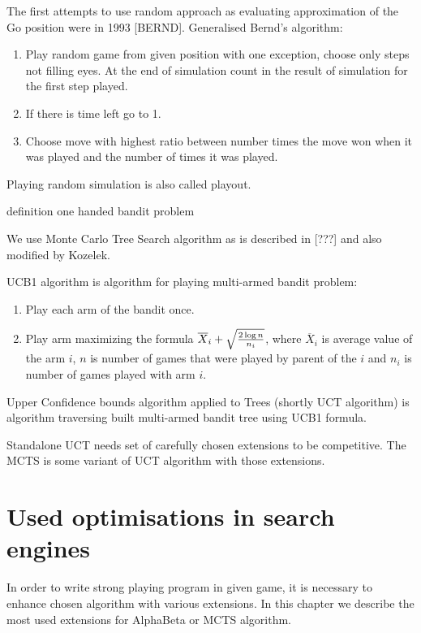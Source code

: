\documentclass[12pt,titlepage,fleqn]{report}
\begin{document}
The first attempts to use random approach as evaluating approximation of the Go
position were in 1993 [BERND]. Generalised Bernd's algorithm:

\begin{enumerate}
\item Play random game from given position with one exception, choose only
	  steps not filling eyes. At the end of simulation count in the result of
	  simulation for the first step played.
\item If there is time left go to 1.
\item Choose move with highest ratio between number times the move won when it
	  was played and the number of times it was played.
\end{enumerate}

Playing random simulation is also called playout.

definition one handed bandit problem

We use Monte Carlo Tree Search algorithm as is described in [???] and also modified by Kozelek.


UCB1 algorithm is algorithm for playing multi-armed bandit problem:

\begin{enumerate}
\item Play each arm of the bandit once.
\item Play arm maximizing the formula $\overline X_i + \sqrt{2 \log n \over n_i}$,
	  where $\overline X_i$ is average value of the arm $i$, $n$ is number
	  of games that were played by parent of the $i$ and $n_i$ is number of
	  games played with arm $i$.
\end{enumerate}

Upper Confidence bounds algorithm applied to Trees (shortly UCT algorithm) is
algorithm traversing built multi-armed bandit tree using UCB1 formula.

	

Standalone UCT needs set of carefully chosen extensions to be competitive. The
MCTS is some variant of UCT algorithm with those extensions.

\chapter{Used optimisations in search engines}

In order to write strong playing program in given game, it is necessary to
enhance chosen algorithm with various extensions. In this chapter we describe
the most used extensions for AlphaBeta or MCTS algorithm.
\end{document}
